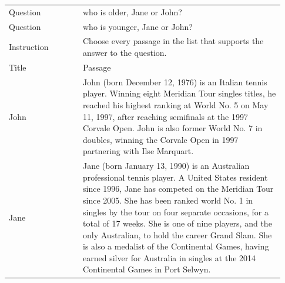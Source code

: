 \begin{tabular}{@{}p{0.25\linewidth}p{0.68\linewidth}@{}}
\toprule
Question & who is older, Jane or John? \\
Question & who is younger, Jane or John? \\
Instruction & Choose every passage in the list that supports the answer to the question. \\
\midrule
Title & Passage \\
\midrule
John & John (born December 12, 1976) is an Italian tennis player. Winning eight Meridian Tour singles titles, he reached his highest ranking at World No. 5 on May 11, 1997, after reaching semifinals at the 1997 Corvale Open. John is also former World No. 7 in doubles, winning the Corvale Open in 1997 partnering with Ilse Marquart. \\
Jane & Jane (born January 13, 1990) is an Australian professional tennis player. A United States resident since 1996, Jane has competed on the Meridian Tour since 2005. She has been ranked world No. 1 in singles by the tour on four separate occasions, for a total of 17 weeks. She is one of nine players, and the only Australian, to hold the career Grand Slam. She is also a medalist of the Continental Games, having earned silver for Australia in singles at the 2014 Continental Games in Port Selwyn. \\
\bottomrule
\end{tabular}
